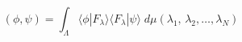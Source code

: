 \begin{equation}
 \left(  \phi ,  \psi \right) = 
 	 \int_\Lambda 	\langle \phi  | F_\lambda  \rangle 
		\langle F_\lambda |\psi\rangle 	\; 
			d\mu (\lambda_1 ,\, \lambda_2 , \dots ,\lambda_N )
\label{eq:partunity}
\end{equation}

